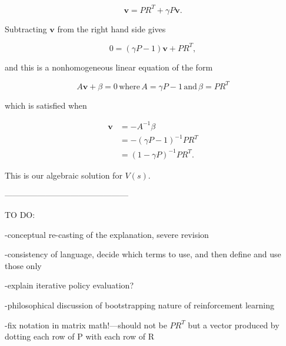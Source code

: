 \documentclass[12pt]{article}
\begin{document}
\begin{equation}
\mathbf{v} = P R^T + \gamma P \mathbf{v}.
\end{equation}

Subtracting $\mathbf{v}$ from the right hand side gives

\begin{equation}
0 = (\gamma P - 1)\mathbf{v} + P R^T,
\end{equation}

and this is a nonhomogeneous linear equation of the form

\begin{equation}
A \mathbf{v} + \beta = 0 \, \mbox{where} \, A = \gamma P - 1 \, \mbox{and} \, \beta = P R^T
\end{equation}

which is satisfied when

\begin{align}
\mathbf{v} &= -A^{-1} \beta \\[5pt]
&= -(\gamma P - 1)^{-1} P R^T \\[5pt]
&= (1 - \gamma P)^{-1} P R^T.
\end{align}

This is our algebraic solution for $V(s)$.

---------------------------------------------

TO DO:

-conceptual re-casting of the explanation, severe revision

-consistency of language, decide which terms to use, and then define and use those only

-explain iterative policy evaluation?

-philosophical discussion of bootstrapping nature of reinforcement learning

-fix notation in matrix math!---should not be $P R^T$ but a vector produced by dotting each row of P with each row of R
\end{document}
